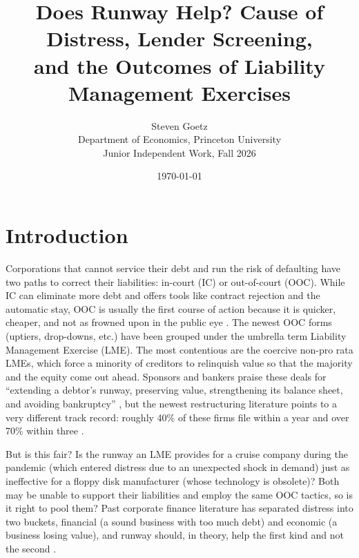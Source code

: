 \documentclass[12pt]{article}
\title{Does Runway Help? Cause of Distress, Lender Screening,\\
       and the Outcomes of Liability Management Exercises}
\author{Steven Goetz\\ Department of Economics, Princeton University\\
        \small Junior Independent Work, Fall 2026}
\date{\today}
\begin{document}
\maketitle

\begin{abstract}
\end{abstract}

\section{Introduction}

Corporations that cannot service their debt and run the risk of defaulting have two paths to correct their liabilities: in-court (IC) or out-of-court (OOC). While IC can eliminate more debt and offers tools like contract rejection and the automatic stay, OOC is usually the first course of action because it is quicker, cheaper, and not as frowned upon in the public eye \citep{schwartz1993, altman2019}. The newest OOC forms (uptiers, drop-downs, etc.) have been grouped under the umbrella term Liability Management Exercise (LME). The most contentious are the coercive non-pro rata LMEs, which force a minority of creditors to relinquish value so that the majority and the equity come out ahead. Sponsors and bankers praise these deals for ``extending a debtor's runway, preserving value, strengthening its balance sheet, and avoiding bankruptcy'' \citep[p.~9]{roerotaru2026}, but the newest restructuring literature points to a very different track record: roughly 40\% of these firms file within a year and over 70\% within three \citep{roerotaru2026}.

But is this fair? Is the runway an LME provides for a cruise company during the pandemic (which entered distress due to an unexpected shock in demand) just as ineffective for a floppy disk manufacturer (whose technology is obsolete)? Both may be unable to support their liabilities and employ the same OOC tactics, so is it right to pool them? Past corporate finance literature has separated distress into two buckets, financial (a sound business with too much debt) and economic (a business losing value), and runway should, in theory, help the first kind and not the second \citep{wruck1990, andrade1998}.
\end{document}
